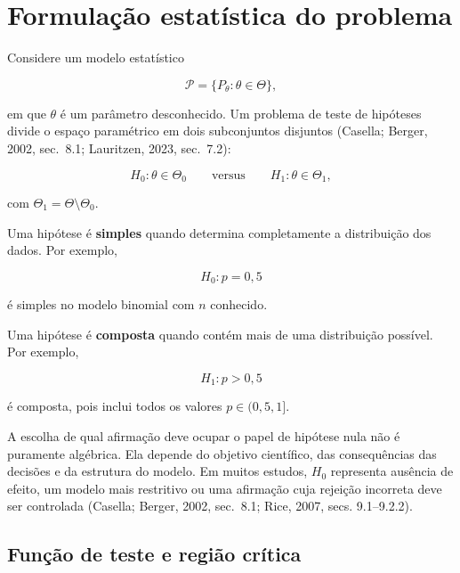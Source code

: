 \documentclass[
  letterpaper,
  DIV=11,
  numbers=noendperiod]{scrreprt}
\begin{document}
\section{Formulação estatística do
problema}\label{formulauxe7uxe3o-estatuxedstica-do-problema}

Considere um modelo estatístico

\[\mathcal{P}=\{P_\theta:\theta\in\Theta\},\]

em que \(\theta\) é um parâmetro desconhecido. Um problema de teste de
hipóteses divide o espaço paramétrico em dois subconjuntos disjuntos
(Casella; Berger, 2002, sec.~8.1; Lauritzen, 2023, sec.~7.2):

\[H_0:\theta\in\Theta_0
\qquad\text{versus}\qquad
H_1:\theta\in\Theta_1,\]

com \(\Theta_1=\Theta\setminus\Theta_0\).

\begin{tcolorbox}[enhanced jigsaw, colback=white, leftrule=.75mm, colbacktitle=quarto-callout-note-color!10!white, breakable, titlerule=0mm, bottomtitle=1mm, title=\textcolor{quarto-callout-note-color}{\faInfo}\hspace{0.5em}{Definição: hipóteses simples e compostas}, colframe=quarto-callout-note-color-frame, toprule=.15mm, opacityback=0, bottomrule=.15mm, opacitybacktitle=0.6, arc=.35mm, toptitle=1mm, rightrule=.15mm, coltitle=black, left=2mm]

Uma hipótese é \textbf{simples} quando determina completamente a
distribuição dos dados. Por exemplo,

\[H_0:p=0{,}5\]

é simples no modelo binomial com \(n\) conhecido.

Uma hipótese é \textbf{composta} quando contém mais de uma distribuição
possível. Por exemplo,

\[H_1:p>0{,}5\]

é composta, pois inclui todos os valores \(p\in(0{,}5,1]\).

\end{tcolorbox}

A escolha de qual afirmação deve ocupar o papel de hipótese nula não é
puramente algébrica. Ela depende do objetivo científico, das
consequências das decisões e da estrutura do modelo. Em muitos estudos,
\(H_0\) representa ausência de efeito, um modelo mais restritivo ou uma
afirmação cuja rejeição incorreta deve ser controlada (Casella; Berger,
2002, sec.~8.1; Rice, 2007, secs. 9.1--9.2.2).

\subsection{Função de teste e região
crítica}\label{funuxe7uxe3o-de-teste-e-regiuxe3o-cruxedtica}
\end{document}
